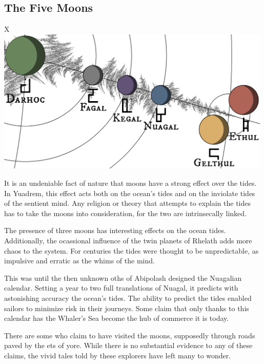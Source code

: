 \subsection*{The Five Moons}

\begin{table}[b]%
    \begin{DndTable}[width=\linewidth]{X}
        \centering
        \includegraphics[width=0.99\textwidth]{01yuadrem/img/42moons.png}
    \end{DndTable}
\end{table}

It is an undeniable fact of nature that moons have a strong effect over the tides.
In Yuadrem, this effect acts both on the ocean's tides and on the inviolate tides of the sentient mind.
Any religion or theory that attempts to explain the tides has to take the moons into consideration, for the two are intrinsecally linked.

The presence of three moons has interesting effects on the ocean tides.
Additionally, the ocassional influence of the twin planets of Rhelath adds more chaos to the system.
For centuries the tides were thought to be unpredictable, as impulsive and erratic as the whims of the mind.

This was until the then unknown oths of Abipolash designed the Nuagalian calendar.
Setting a year to two full translations of Nuagal, it predicts with astonishing accuracy the ocean's tides.
The ability to predict the tides enabled sailors to minimize risk in their journeys.
Some claim that only thanks to this calendar has the Whaler's Sea become the hub of commerce it is today.

There are some who claim to have visited the moons, supposedly through roads paved by the ets of yore.
While there is no substantial evidence to any of these claims, the vivid tales told by these explorers have left many to wonder.

